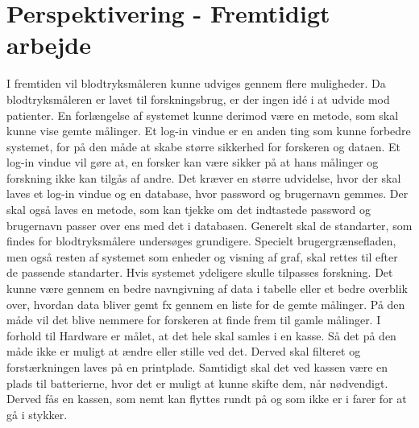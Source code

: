 \section{Perspektivering - Fremtidigt arbejde}
I fremtiden vil blodtryksmåleren kunne udviges gennem flere muligheder. Da blodtryksmåleren er lavet til forskningsbrug, er der ingen idé i at udvide mod patienter.  En forlængelse af systemet kunne derimod være en metode, som skal kunne vise gemte målinger. \newline Et log-in vindue er en anden ting som kunne forbedre systemet, for på den måde at skabe større sikkerhed for forskeren og dataen. Et log-in vindue vil gøre at, en forsker kan være sikker på at hans målinger og forskning ikke kan tilgås af andre. Det kræver en større udvidelse, hvor der skal laves et log-in vindue og en database, hvor password og brugernavn gemmes. Der skal også laves en metode, som kan tjekke om det indtastede password og brugernavn passer over ens med det i databasen. 
\newline
Generelt skal de standarter, som findes for blodtryksmålere undersøges grundigere. Specielt brugergrænsefladen, men også resten af systemet som enheder og visning af graf, skal rettes til efter de passende standarter.
\newline 
Hvis systemet ydeligere skulle tilpasses forskning.  Det kunne være gennem en bedre navngivning af data i tabelle eller et bedre overblik over, hvordan data bliver gemt fx gennem en liste for de gemte målinger. På den måde vil det blive nemmere for forskeren at finde frem til gamle målinger.   
\newline 
I forhold til Hardware er målet, at det hele skal samles i en kasse. Så det på den måde ikke er muligt at ændre eller stille ved det. Derved skal filteret og forstærkningen laves på en printplade. Samtidigt skal det ved kassen være en plads til batterierne, hvor det er muligt at kunne skifte dem, når nødvendigt. Derved fås en kassen, som nemt kan flyttes rundt på og som ikke er i farer for at gå i stykker.   